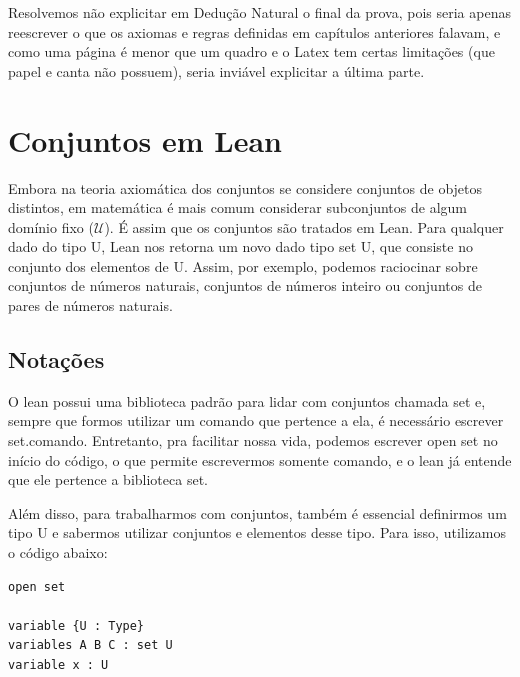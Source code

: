   \qquad
  
    Resolvemos não explicitar em Dedução Natural o final da prova, pois seria apenas reescrever o que os axiomas e regras definidas em capítulos anteriores falavam, e como uma página é menor que um quadro e o Latex tem certas limitações (que papel e canta não possuem), seria inviável explicitar a última parte.

\qquad

\section{Conjuntos em Lean}
Embora na teoria axiomática dos conjuntos se considere conjuntos de objetos distintos, em matemática é mais comum considerar subconjuntos de algum domínio fixo ($\mathcal U $). É assim que os conjuntos são tratados em Lean. Para qualquer dado do tipo {\selectfont U}, Lean nos retorna um novo dado tipo {\selectfont set U}, que consiste no conjunto dos elementos de {\selectfont U}. Assim, por exemplo, podemos raciocinar sobre conjuntos de números naturais, conjuntos de números inteiro ou conjuntos de pares de números naturais.

\subsection{Notações}
O lean possui uma biblioteca padrão para lidar com conjuntos chamada {\selectfont set} e, sempre que formos utilizar um comando que pertence a ela, é necessário escrever {\selectfont set.comando}. Entretanto, pra facilitar nossa vida, podemos escrever {\selectfont open set} no início do código, o que permite escrevermos somente {\selectfont comando}, e o lean já entende que ele pertence a biblioteca set.

Além disso, para trabalharmos com conjuntos, também é essencial definirmos um tipo {\selectfont U} e sabermos utilizar conjuntos e elementos desse tipo. Para isso, utilizamos o código abaixo:

\begin{lstlisting}
open set

variable {U : Type}
variables A B C : set U
variable x : U \end{lstlisting}

